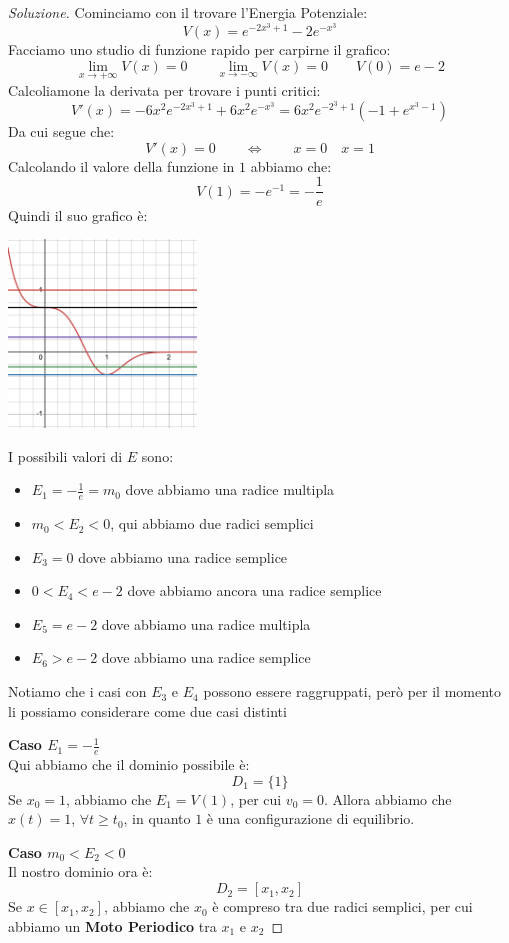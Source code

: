 \documentclass[11pt,a4paper,twoside]{article}
\theoremstyle{definition}
\newenvironment{sol}
	{\renewcommand\qedsymbol{$\blacksquare$}\begin{proof}[Soluzione]}
	{\end{proof}}
\begin{document}
\begin{sol}
	Cominciamo con il trovare l'Energia Potenziale:
	\[ V(x) = e^{-2x^3+1} - 2e^{-x^3} \]
	Facciamo uno studio di funzione rapido per carpirne il grafico:
	\[ \lim_{x \to +\infty} V(x) = 0 \qquad \lim_{x \to -\infty}V(x) = 0 \qquad V(0) = e-2\]
	Calcoliamone la derivata per trovare i punti critici:
	\[ V'(x) = -6x^2e^{-2x^3+1} + 6x^2e^{-x^3} = 6x^2 e^{-2^3+1} (-1 + e^{x^3-1}) \]
	Da cui segue che:
	\[ V'(x) = 0\qquad \Leftrightarrow \qquad x = 0\quad x = 1 \]
	Calcolando il valore della funzione in $1$ abbiamo che:
	\[ V(1) = -e^{-1} = -\frac 1e \]
	Quindi il suo grafico è:
	\begin{center}
		\includegraphics[height=5cm]{Grafico4}
	\end{center}
	I possibili valori di $E$ sono:
	\begin{itemize}
		\item $E_1= -\frac 1e = m_0$ dove abbiamo una radice multipla
		\item $m_0< E_2< 0$, qui abbiamo due radici semplici
		\item $E_3 = 0$ dove abbiamo una radice semplice
		\item $0<E_4<e-2$ dove abbiamo ancora una radice semplice
		\item $E_5 = e-2$ dove abbiamo una radice multipla
		\item $E_6 > e-2$ dove abbiamo una radice semplice
	\end{itemize}
	Notiamo che i casi con $E_3$ e $E_4$ possono essere raggruppati, però per il momento li possiamo considerare come due casi distinti

	\textbf{Caso $E_1 = -\frac 1e$}\\
	Qui abbiamo che il dominio possibile è:
	\[ D_1 = \{1\} \]
	Se $x_0 = 1$, abbiamo che $E_1 = V(1)$, per cui $v_0 = 0$. Allora abbiamo che $x(t) = 1$, $\forall t \geq t_0$, in quanto $1$ è una configurazione di equilibrio.

	\textbf{Caso $m_0 < E_2<0$}\\
	Il nostro dominio ora è:
	\[ D_2 = [x_1,x_2] \]
	Se $x \in [x_1,x_2]$, abbiamo che $x_0$ è compreso tra due radici semplici, per cui abbiamo un \textbf{Moto Periodico} tra $x_1$ e $x_2$


\end{sol}
\end{document}
